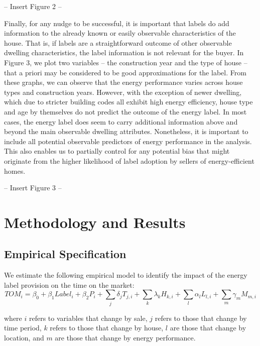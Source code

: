 \documentclass[12pt]{article}
\begin{document}
\begin{center}
-- Insert Figure 2 --
\end{center}

Finally, for any nudge to be successful, it is important that labels do add information to the already known or easily observable characteristics of the house. That is, if labels are a straightforward outcome of other observable dwelling characteristics, the label information is not relevant for the buyer. In Figure 3, we plot two variables – the construction year and the type of house – that a priori may be considered to be good approximations for the label. From these graphs, we can observe that the energy performance varies across house types and construction years. However, with the exception of newer dwelling, which due to stricter building codes all exhibit high energy efficiency, house type and age by themselves do not predict the outcome of the energy label. In most cases, the energy label does seem to carry additional information above and beyond the main observable dwelling attributes. Nonetheless, it is important to include all potential observable predictors of energy performance in the analysis. This also enables us to partially control for any potential bias that might originate from the higher likelihood of label adoption by sellers of energy-efficient homes.

\begin{center}
-- Insert Figure 3 --
\end{center}

\section{Methodology and Results}

\subsection{Empirical Specification}

We estimate the following empirical model to identify the impact of the energy label provision on the time on the market:  
\begin{equation}
TOM_{i} = \beta_0 + \beta_1 Label_i + \beta_2 P_i + \sum_j \delta_j T_{j,i} + \sum_k \lambda_k H_{k,i} + \sum_l \alpha_l L_{l,i} + \sum_m \gamma_m M_{m,i} 
\end{equation}

\noindent where $i$ refers to variables that change by sale, $j$ refers to those that change by time period, $k$ refers to those that change by house, $l$ are those that change by location, and $m$ are those that change by energy performance.
 
\end{document}
